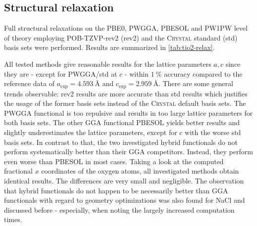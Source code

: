\documentclass[a4paper,12pt]{scrartcl}
\begin{document}
\subsection{Structural relaxation}
%
Full structural relaxations on the PBE0, PWGGA, PBESOL\autocite[]{pbesol} and PW1PW level of theory employing POB-TZVP-rev2 (rev2) and the \textsc{Crystal} standard (std) basis sets were performed. Results are summarized in \autoref{tab:tio2-relax}.

All tested methods give reasonable results for the lattice parameters $ a, c $ since they are - except for PWGGA/std at $ c $ - within $ \SI{1}{\percent} $ accuracy compared to the reference data of $ a_\mathrm{exp} = \SI{4.593}{\angstrom} $ and $ c_\mathrm{exp} = \SI{2.959}{\angstrom} $. There are some general trends observable: rev2 results are more accurate than std results which justifies the usage of the former basis sets instead of the \textsc{Crystal} default basis sets. The PWGGA functional is too repulsive and results in too large lattice parameters for both basis sets. The other GGA functional PBESOL yields better results and slightly underestimates the lattice parameters, except for $ c $ with the worse std basis sets. In contrast to that, the two investigated hybrid functionals do not perform systematically better than their GGA competitors. Instead, they perform even worse than PBESOL in most cases. Taking a look at the computed fractional $ x $ coordinates of the oxygen atoms, all investigated methods obtain identical results. The differences are very small and negligible. The observation that hybrid functionals do not happen to be necessarily better than GGA functionals with regard to geometry optimizations was also found for NaCl and discussed before - especially, when noting the largely increased computation times. 
%
\end{document}
